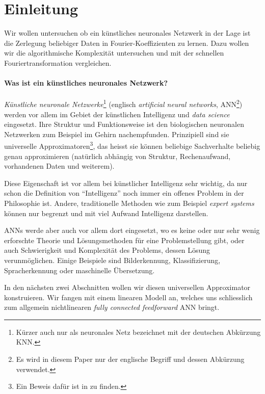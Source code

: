 %
%
%
%
\section{Einleitung\label{ml:einleitung}}

Wir wollen untersuchen ob ein künstliches neuronales Netzwerk in der Lage ist die Zerlegung beliebiger
Daten in Fourier-Koeffizienten zu lernen. Dazu wollen wir die algorithmische
Komplexität untersuchen und mit der schnellen Fouriertransformation vergleichen.

\paragraph{Was ist ein künstliches neuronales Netzwerk?} \emph{Künstliche neuronale
Netzwerke}\footnote{Kürzer auch nur als neuronales Netz bezeichnet mit der deutschen
Abkürzung KNN.} (englisch \emph{artificial neural networks}, ANN\footnote{Es wird in
diesem Paper nur der englische Begriff und dessen Abkürzung verwendet.}) werden vor allem im Gebiet der
künstlichen Intelligenz und \emph{data science} eingesetzt. Ihre Struktur und Funktionsweise ist den
biologischen neuronalen Netzwerken zum Beispiel im Gehirn nachempfunden. Prinzipiell sind
sie universelle Approximatoren\footnote{Ein Beweis dafür ist in
\cite{ml:universala-approximator-theorem} zu finden.}, das heisst sie können beliebige
Sachverhalte beliebig genau approximieren (natürlich abhängig von Struktur, Rechenaufwand,
vorhandenen Daten und weiterem).

Diese Eigenschaft ist vor allem bei künstlicher Intelligenz sehr wichtig,
da nur schon die Definition von ``Intelligenz'' noch immer ein offenes Problem in der
Philosophie ist. Andere, traditionelle Methoden wie zum Beispiel \emph{expert systems} können
nur begrenzt und mit viel Aufwand Intelligenz darstellen.

ANNs werde aber auch vor allem dort eingesetzt, wo es keine oder nur sehr wenig erforschte
Theorie und Lösungsmethoden für eine Problemstellung gibt, oder auch Schwierigkeit und
Komplexität des Problems, dessen Lösung verunmöglichen. Einige Beispiele sind
Bilderkennung, Klassifizierung, Spracherkennung oder maschinelle Übersetzung.

\medskip
In den nächsten zwei Abschnitten wollen wir diesen universellen Approximator konstruieren.
Wir fangen mit einem linearen Modell an, welches uns schliesslich zum allgemein
nichtlinearen \emph{fully connected feedforward} ANN bringt.
